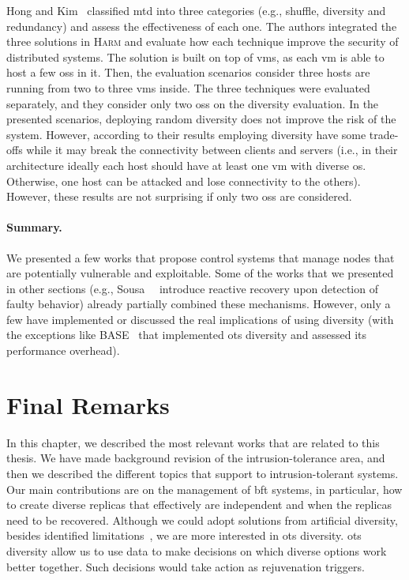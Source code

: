 Hong and Kim~\cite{Hong:2015} classified \gls{mtd} into three categories (e.g., shuffle, diversity and redundancy) and assess the effectiveness of each one. 
The authors integrated the three solutions in \textsc{Harm} and evaluate how each technique improve the security of distributed systems.
The solution is built on top of \glspl{vm}, as each \gls{vm} is able to host a few \glspl{os} in it.
Then, the evaluation scenarios consider three hosts are running from two to three \glspl{vm} inside.
The three techniques were evaluated separately, and they consider only two \glspl{os} on the diversity evaluation.
In the presented scenarios, deploying random diversity does not improve the risk of the system. However, according to their results employing diversity have some trade-offs while it may break the connectivity between clients and servers (i.e., in their architecture ideally each host should have at least one \gls{vm} with diverse \gls{os}. 
Otherwise, one host can be attacked and lose connectivity to the others).
However, these results are not surprising if only two \glspl{os} are considered. 

\paragraph{Summary.}
We presented a few works that propose control systems that manage nodes that are potentially vulnerable and exploitable.
Some of the works that we presented in other sections (e.g., Sousa~\etal{}~\cite{Sousa:2010} introduce reactive recovery upon detection of faulty behavior) already partially combined these mechanisms. 
However, only a few have implemented or discussed the real implications of using diversity (with the exceptions like BASE~\cite{Rodrigues:2001} that implemented \gls{ots} diversity and assessed its performance overhead).


\section{Final Remarks}
In this chapter, we described the most relevant works that are related to this thesis.
We have made background revision of the intrusion-tolerance area, and then we described the different topics that support to intrusion-tolerant systems.
Our main contributions are on the management of \gls{bft} systems, in particular, how to create diverse replicas that effectively are independent and when the replicas need to be recovered. 
Although we could adopt solutions from artificial diversity, besides identified limitations~\cite{Snow:2013,Bittau:2014}, we are more interested in \gls{ots} diversity.
\gls{ots} diversity allow us to use data to make decisions on which diverse options work better together.
Such decisions would take action as rejuvenation triggers. 





